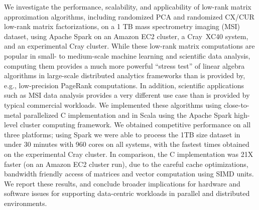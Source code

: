 We investigate the performance, scalability, and applicability of low-rank matrix approximation algorithms, including randomized PCA and randomized CX/CUR low-rank matrix factorizations, on a 1 TB mass spectrometry imaging (MSI) dataset, using Apache Spark on an Amazon EC2 cluster, a 
Cray~XC40 system, and an experimental Cray cluster.
While these low-rank matrix computations are popular in small- to medium-scale machine learning and scientific data analysis, computing them provides a much more powerful ``stress test'' of linear algebra algorithms in large-scale distributed analytics frameworks than is provided by, e.g., low-precision PageRank computations.
In addition, scientific applications such as MSI data analysis provides a very different use case 
than is provided by typical commercial workloads.
We implemented these algorithms using close-to-metal parallelized C 
implementation and in Scala using the Apache Spark high-level cluster computing framework.  
We obtained competitive performance on all three platforms; 
using Spark we were able to process the 1TB size dataset in under 30 minutes with 960 cores on all systems, with the fastest times obtained on the experimental Cray cluster.
In comparison, the C implementation was 21X faster (on an Amazon EC2 cluster run), due to the careful cache optimizations,
bandwidth friendly access of matrices and vector computation using
SIMD units. 
We report these results, and conclude broader implications for hardware and software issues for supporting data-centric workloads in parallel and distributed environments.  
